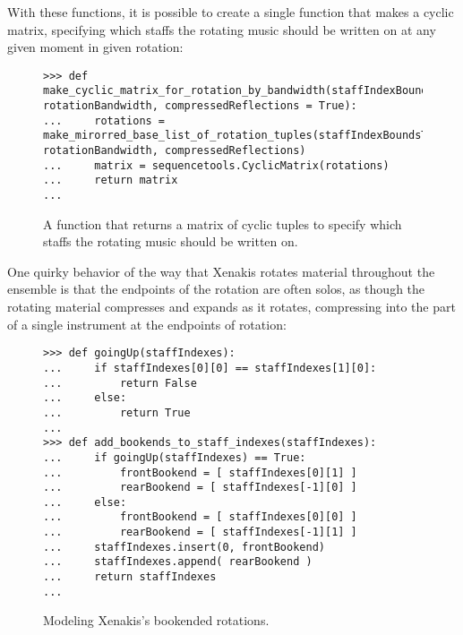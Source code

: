 With these functions, it is possible to create a single function that makes a cyclic matrix, specifying which staffs the rotating music should be written on at any given moment in given rotation:

\begin{figure}[H]
\begin{lstlisting}[basicstyle=\scriptsize\ttfamily, breaklines=True, tabsize=4, showtabs=false, showspaces=false]
>>> def make_cyclic_matrix_for_rotation_by_bandwidth(staffIndexBoundsTuple, rotationBandwidth, compressedReflections = True):
...     rotations = make_mirorred_base_list_of_rotation_tuples(staffIndexBoundsTuple, rotationBandwidth, compressedReflections)
...     matrix = sequencetools.CyclicMatrix(rotations)
...     return matrix
... \end{lstlisting}

\caption{A function that returns a matrix of cyclic tuples to specify which staffs the rotating music should be written on. } 
\end{figure}


One quirky behavior of the way that Xenakis rotates material throughout the ensemble is that the endpoints of the rotation are often solos, as though the rotating material compresses and expands as it rotates, compressing into the part of a single instrument at the endpoints of rotation:

\begin{figure}[H]
\begin{lstlisting}[basicstyle=\scriptsize\ttfamily, breaklines=True, tabsize=4, showtabs=false, showspaces=false]
>>> def goingUp(staffIndexes):
...     if staffIndexes[0][0] == staffIndexes[1][0]:
...         return False
...     else:
...         return True
... 
>>> def add_bookends_to_staff_indexes(staffIndexes):
...     if goingUp(staffIndexes) == True:           
...         frontBookend = [ staffIndexes[0][1] ]
...         rearBookend = [ staffIndexes[-1][0] ]
...     else:
...         frontBookend = [ staffIndexes[0][0] ]
...         rearBookend = [ staffIndexes[-1][1] ]
...     staffIndexes.insert(0, frontBookend)
...     staffIndexes.append( rearBookend )
...     return staffIndexes
... \end{lstlisting}

\caption{Modeling Xenakis's bookended rotations. } 
\end{figure}

